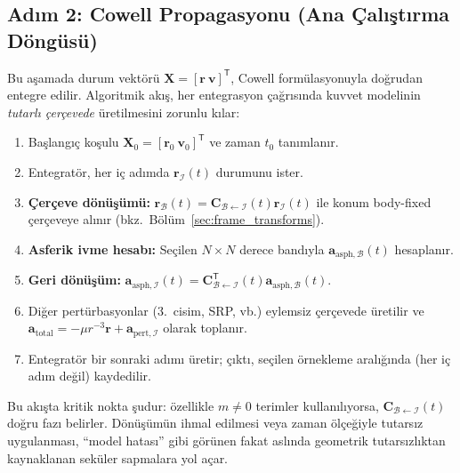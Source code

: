 \subsection{Adım 2: Cowell Propagasyonu (Ana Çalıştırma Döngüsü)}
Bu aşamada durum vektörü $\mathbf X=[\mathbf r\ \mathbf v]^{\mathsf T}$, Cowell formülasyonuyla doğrudan entegre edilir.
Algoritmik akış, her entegrasyon çağrısında kuvvet modelinin \emph{tutarlı çerçevede} üretilmesini zorunlu kılar:
\begin{enumerate}
    \item Başlangıç koşulu $\mathbf X_0=[\mathbf r_0\ \mathbf v_0]^{\mathsf T}$ ve zaman $t_0$ tanımlanır.
    \item Entegratör, her iç adımda $\mathbf r_{\mathcal I}(t)$ durumunu ister.
    \item \textbf{Çerçeve dönüşümü:} $\mathbf r_{\mathcal B}(t)=\mathbf C_{\mathcal B\leftarrow\mathcal I}(t)\mathbf r_{\mathcal I}(t)$
    ile konum body-fixed çerçeveye alınır (bkz.\ Bölüm~\ref{sec:frame_transforms}).
    \item \textbf{Asferik ivme hesabı:} Seçilen $N\times N$ derece bandıyla $\mathbf a_{\text{asph},\mathcal B}(t)$ hesaplanır.
    \item \textbf{Geri dönüşüm:} $\mathbf a_{\text{asph},\mathcal I}(t)=\mathbf C_{\mathcal B\leftarrow\mathcal I}^{\mathsf T}(t)\mathbf a_{\text{asph},\mathcal B}(t)$.
    \item Diğer pertürbasyonlar (3.\ cisim, SRP, vb.) eylemsiz çerçevede üretilir ve
    $\mathbf a_{\text{total}}=-\mu r^{-3}\mathbf r + \mathbf a_{\text{pert},\mathcal I}$ olarak toplanır.
    \item Entegratör bir sonraki adımı üretir; çıktı, seçilen örnekleme aralığında (her iç adım değil) kaydedilir.
\end{enumerate}
Bu akışta kritik nokta şudur: özellikle $m\neq 0$ terimler kullanılıyorsa, $\mathbf C_{\mathcal B\leftarrow\mathcal I}(t)$
doğru fazı belirler. Dönüşümün ihmal edilmesi veya zaman ölçeğiyle tutarsız uygulanması, ``model hatası'' gibi görünen fakat
aslında geometrik tutarsızlıktan kaynaklanan seküler sapmalara yol açar.

